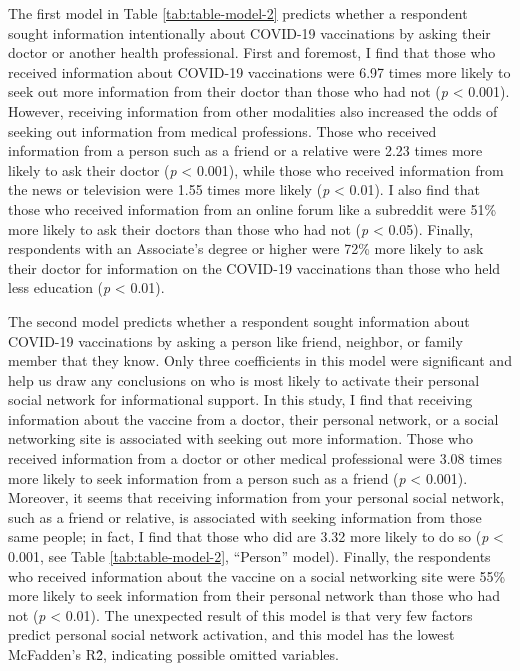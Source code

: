 The first model in Table \ref{tab:table-model-2} predicts whether a respondent
sought information intentionally about COVID-19 vaccinations by asking their
doctor or another health professional. First and foremost, I find that those who
received information about COVID-19 vaccinations were 6.97 times more likely to
seek out more information from their doctor than those who had not (\emph{p}
\textless{} 0.001). However, receiving information from other modalities also
increased the odds of seeking out information from medical professions. Those
who received information from a person such as a friend or a relative were 2.23
times more likely to ask their doctor (\emph{p} \textless{} 0.001), while those
who received information from the news or television were 1.55 times more likely
(\emph{p} \textless{} 0.01). I also find that those who received information
from an online forum like a subreddit were 51\% more likely to ask their doctors
than those who had not (\emph{p} \textless{} 0.05). Finally, respondents with an
Associate's degree or higher were 72\% more likely to ask their doctor for
information on the COVID-19 vaccinations than those who held less education
(\emph{p} \textless{} 0.01).

The second model predicts whether a respondent sought information about COVID-19
vaccinations by asking a person like friend, neighbor, or family member that
they know. Only three coefficients in this model were significant and help us
draw any conclusions on who is most likely to activate their personal social
network for informational support. In this study, I find that receiving
information about the vaccine from a doctor, their personal network, or a social
networking site is associated with seeking out more information. Those who
received information from a doctor or other medical professional were 3.08 times
more likely to seek information from a person such as a friend (\emph{p}
\textless{} 0.001). Moreover, it seems that receiving information from your
personal social network, such as a friend or relative, is associated with
seeking information from those same people; in fact, I find that those who did
are 3.32 more likely to do so (\emph{p} \textless{} 0.001, see Table
\ref{tab:table-model-2}, ``Person'' model). Finally, the
respondents who received information about the vaccine on a social networking
site were 55\% more likely to seek information from their personal network than
those who had not (\emph{p} \textless{} 0.01). The unexpected result of this
model is that very few factors predict personal social network activation, and
this model has the lowest McFadden's R\^{2}, indicating possible omitted
variables.

